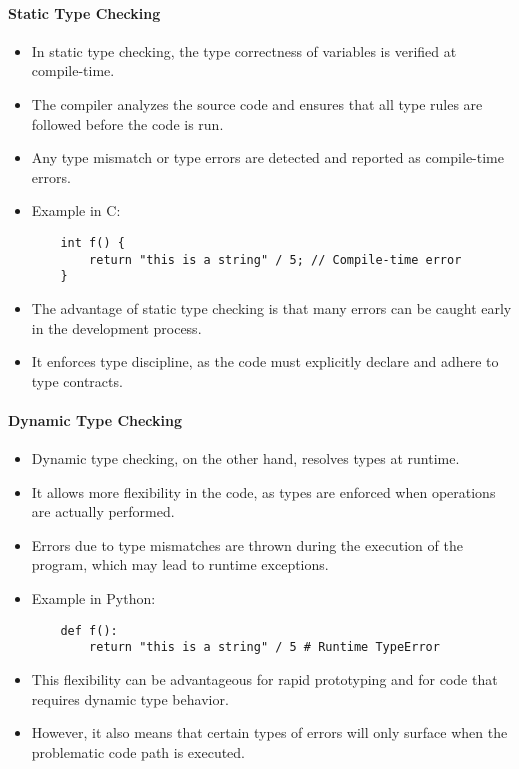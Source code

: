 \documentclass[12pt]{article}
\begin{document}
\paragraph{Static Type Checking}
\begin{itemize}
    \item In static type checking, the type correctness of variables is verified at compile-time.
    \item The compiler analyzes the source code and ensures that all type rules are followed before the code is run.
    \item Any type mismatch or type errors are detected and reported as compile-time errors.
    \item Example in C:
    \begin{verbatim}
    int f() {
        return "this is a string" / 5; // Compile-time error
    }
    \end{verbatim}
    \item The advantage of static type checking is that many errors can be caught early in the development process.
    \item It enforces type discipline, as the code must explicitly declare and adhere to type contracts.
\end{itemize}

\paragraph{Dynamic Type Checking}
\begin{itemize}
    \item Dynamic type checking, on the other hand, resolves types at runtime.
    \item It allows more flexibility in the code, as types are enforced when operations are actually performed.
    \item Errors due to type mismatches are thrown during the execution of the program, which may lead to runtime exceptions.
    \item Example in Python:
    \begin{verbatim}
    def f():
        return "this is a string" / 5 # Runtime TypeError
    \end{verbatim}
    \item This flexibility can be advantageous for rapid prototyping and for code that requires dynamic type behavior.
    \item However, it also means that certain types of errors will only surface when the problematic code path is executed.
\end{itemize}
\end{document}
